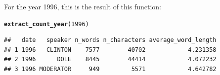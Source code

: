\documentclass{llncs}\usepackage[]{graphicx}\usepackage[]{color}
\makeatletter
\newcommand{\hlnum}[1]{\textcolor[rgb]{0.686,0.059,0.569}{#1}}%
\newcommand{\hlstd}[1]{\textcolor[rgb]{0.345,0.345,0.345}{#1}}%
\newcommand{\hlkwd}[1]{\textcolor[rgb]{0.737,0.353,0.396}{\textbf{#1}}}%
\newenvironment{kframe}{%
 \def\at@end@of@kframe{}%
 \ifinner\ifhmode%
  \def\at@end@of@kframe{\end{minipage}}%
  \begin{minipage}{\columnwidth}%
 \fi\fi%
 \def\FrameCommand##1{\hskip\@totalleftmargin \hskip-\fboxsep
 \colorbox{shadecolor}{##1}\hskip-\fboxsep
     \hskip-\linewidth \hskip-\@totalleftmargin \hskip\columnwidth}%
 \MakeFramed {\advance\hsize-\width
   \@totalleftmargin\z@ \linewidth\hsize
   \@setminipage}}%
 {\par\unskip\endMakeFramed%
 \at@end@of@kframe}
\newenvironment{knitrout}{}{} %
\makeatother
\begin{document}
For the year 1996, this is the result of this function:
\begin{knitrout}
\color{fgcolor}\begin{kframe}
\begin{alltt}
\hlkwd{extract_count_year}\hlstd{(}\hlnum{1996}\hlstd{)}
\end{alltt}
\begin{lstlisting}[basicstyle=\ttfamily,breaklines=true]
##   date   speaker n_words n_characters average_word_length
## 1 1996   CLINTON    7577        40702            4.231358
## 2 1996      DOLE    8445        44414            4.072232
## 3 1996 MODERATOR     949         5571            4.642782
\end{lstlisting}
\end{kframe}
\end{knitrout}
\end{document}
